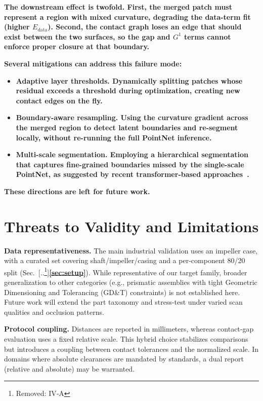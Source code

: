 \documentclass{ieeeaccess}
\providecommand{\DIFaddtex}[1]{{\color{blue}\bfseries #1}} %
\providecommand{\DIFdeltex}[1]{{\color{red}[..\footnote{\color{black}Removed: #1}]}} %
\providecommand{\DIFaddbegin}{} %
\providecommand{\DIFaddend}{} %
\providecommand{\DIFdelbegin}{} %
\providecommand{\DIFdelend}{} %
\providecommand{\DIFadd}[1]{\texorpdfstring{\DIFaddtex{#1}}{#1}} %
\providecommand{\DIFdel}[1]{\texorpdfstring{\DIFdeltex{#1}}{}} %
\begin{document}
\DIFadd{The downstream effect is twofold. First, the merged patch must represent a region with mixed curvature, degrading the data-term fit (higher $E_{\text{data}}$). Second, the contact graph loses an edge that should exist between the two surfaces, so the gap and $G^1$ terms cannot enforce proper closure at that boundary.
}

\DIFadd{Several mitigations can address this failure mode:
}\begin{itemize}
  \item \DIFadd{\textbf{Adaptive layer thresholds.} Dynamically splitting patches whose residual exceeds a threshold during optimization, creating new contact edges on the fly.
  }\item \DIFadd{\textbf{Boundary-aware resampling.} Using the curvature gradient across the merged region to detect latent boundaries and re-segment locally, without re-running the full PointNet inference.
  }\item \DIFadd{\textbf{Multi-scale segmentation.} Employing a hierarchical segmentation that captures fine-grained boundaries missed by the single-scale PointNet, as suggested by recent transformer-based approaches~\cite{b23}.
}\end{itemize}
\DIFadd{These directions are left for future work.
}

\DIFaddend \section{Threats to Validity and Limitations}
\label{sec:limitations}

\textbf{Data representativeness.} The main industrial validation uses an
impeller case, with a curated set covering shaft/impeller/casing and a
per-component 80/20 split (Sec.~\DIFdelbegin \DIFdel{IV‑A}\DIFdelend \DIFaddbegin \DIFadd{\ref{sec:setup}}\DIFaddend ). While representative of our
target family, broader generalization to other categories (e.g., prismatic
assemblies with tight Geometric Dimensioning and Tolerancing (GD\&T) constraints) is not established here. Future
work will extend the part taxonomy and stress-test under varied scan
qualities and occlusion patterns.

\textbf{Protocol coupling.} Distances are reported in millimeters, whereas
contact-gap evaluation uses a fixed relative scale. This hybrid choice
stabilizes comparisons but introduces a coupling between contact
tolerances and the normalized scale. In domains where absolute
clearances are mandated by standards, a dual report (relative and
absolute) may be warranted. 
\end{document}
